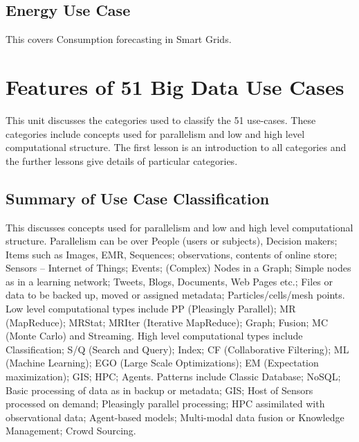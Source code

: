 


\subsection{Energy Use Case}

This covers Consumption forecasting in Smart Grids.





\section{Features of 51 Big Data Use Cases}

This unit discusses the categories used to classify the 51 use-cases.
These categories include concepts used for parallelism and low and high
level computational structure. The first lesson is an introduction to
all categories and the further lessons give details of particular
categories.




\subsection{Summary of Use Case Classification}

This discusses concepts used for parallelism and low and high level
computational structure. Parallelism can be over People (users or
subjects), Decision makers; Items such as Images, EMR, Sequences;
observations, contents of online store; Sensors -- Internet of Things;
Events; (Complex) Nodes in a Graph; Simple nodes as in a learning
network; Tweets, Blogs, Documents, Web Pages etc.; Files or data to be
backed up, moved or assigned metadata; Particles/cells/mesh points. Low
level computational types include PP (Pleasingly Parallel); MR
(MapReduce); MRStat; MRIter (Iterative MapReduce); Graph; Fusion; MC
(Monte Carlo) and Streaming. High level computational types include
Classification; S/Q (Search and Query); Index; CF (Collaborative
Filtering); ML (Machine Learning); EGO (Large Scale Optimizations); EM
(Expectation maximization); GIS; HPC; Agents. Patterns include Classic
Database; NoSQL; Basic processing of data as in backup or metadata; GIS;
Host of Sensors processed on demand; Pleasingly parallel processing; HPC
assimilated with observational data; Agent-based models; Multi-modal
data fusion or Knowledge Management; Crowd Sourcing.


